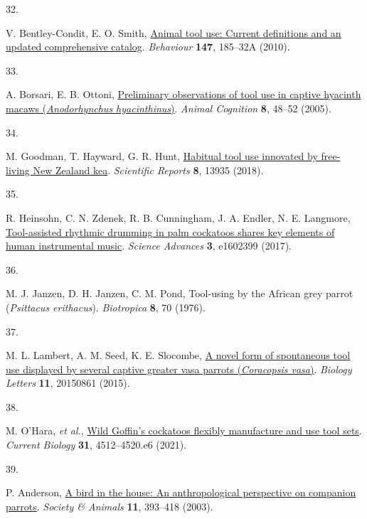 \documentclass[
  man,floatsintext]{apa6}
\newlength{\cslhangindent}
\newlength{\csllabelwidth}
\newlength{\cslentryspacingunit} %
\newenvironment{CSLReferences}[2] %
 {%
  \setlength{\parindent}{0pt}
  \ifodd #1
  \let\oldpar\par
  \def\par{\hangindent=\cslhangindent\oldpar}
  \fi
  \setlength{\parskip}{#2\cslentryspacingunit}
 }%
 {}
\newcommand{\CSLLeftMargin}[1]{\parbox[t]{\csllabelwidth}{#1}}
\newcommand{\CSLRightInline}[1]{\parbox[t]{\linewidth - \csllabelwidth}{#1}\break}
\begin{document}
\begin{CSLReferences}{0}{0}
\leavevmode{}%
\CSLLeftMargin{32. }%
\CSLRightInline{V. Bentley-Condit, E. O. Smith, \href{https://doi.org/10.1163/000579509X12512865686555}{Animal tool use: Current definitions and an updated comprehensive catalog}. \emph{Behaviour} \textbf{147}, 185--32A (2010).}

\leavevmode{}%
\CSLLeftMargin{33. }%
\CSLRightInline{A. Borsari, E. B. Ottoni, \href{https://doi.org/10.1007/s10071-004-0221-3}{Preliminary observations of tool use in captive hyacinth macaws (\emph{{A}nodorhynchus hyacinthinus})}. \emph{Animal Cognition} \textbf{8}, 48--52 (2005).}

\leavevmode{}%
\CSLLeftMargin{34. }%
\CSLRightInline{M. Goodman, T. Hayward, G. R. Hunt, \href{https://doi.org/10.1038/s41598-018-32363-9}{Habitual tool use innovated by free-living {N}ew {Z}ealand kea}. \emph{Scientific Reports} \textbf{8}, 13935 (2018).}

\leavevmode{}%
\CSLLeftMargin{35. }%
\CSLRightInline{R. Heinsohn, C. N. Zdenek, R. B. Cunningham, J. A. Endler, N. E. Langmore, \href{https://doi.org/10.1126/sciadv.1602399}{Tool-assisted rhythmic drumming in palm cockatoos shares key elements of human instrumental music}. \emph{Science Advances} \textbf{3}, e1602399 (2017).}

\leavevmode{}%
\CSLLeftMargin{36. }%
\CSLRightInline{M. J. Janzen, D. H. Janzen, C. M. Pond, Tool-using by the {A}frican grey parrot (\emph{{P}sittacus erithacus}). \emph{Biotropica} \textbf{8}, 70 (1976).}

\leavevmode{}%
\CSLLeftMargin{37. }%
\CSLRightInline{M. L. Lambert, A. M. Seed, K. E. Slocombe, \href{https://doi.org/10.1098/rsbl.2015.0861}{A novel form of spontaneous tool use displayed by several captive greater vasa parrots (\emph{{C}oracopsis vasa})}. \emph{Biology Letters} \textbf{11}, 20150861 (2015).}

\leavevmode{}%
\CSLLeftMargin{38. }%
\CSLRightInline{M. O'Hara, \emph{et al.}, \href{https://doi.org/10.1016/j.cub.2021.08.009}{Wild {G}offin's cockatoos flexibly manufacture and use tool sets}. \emph{Current Biology} \textbf{31}, 4512--4520.e6 (2021).}

\leavevmode{}%
\CSLLeftMargin{39. }%
\CSLRightInline{P. Anderson, \href{https://doi.org/10.1163/156853003322796109}{A bird in the house: An anthropological perspective on companion parrots}. \emph{Society \& Animals} \textbf{11}, 393--418 (2003).}


\end{CSLReferences}
\end{document}
